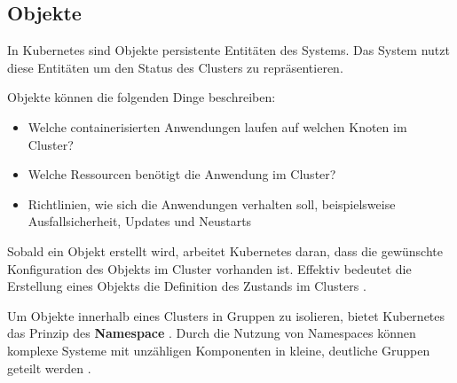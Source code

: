 \subsection{Objekte}
\label{sec:kubernetes:objekte}
In Kubernetes sind Objekte persistente Entitäten des Systems. 
Das System nutzt diese Entitäten um den Status des Clusters zu repräsentieren.

Objekte können die folgenden Dinge beschreiben:
\begin{itemize}
  \item Welche containerisierten Anwendungen laufen auf welchen Knoten im Cluster?
  \item Welche Ressourcen benötigt die Anwendung im Cluster?
  \item Richtlinien, wie sich die Anwendungen verhalten soll, beispielsweise Ausfallsicherheit, Updates und Neustarts
\end{itemize}

Sobald ein Objekt erstellt wird, arbeitet Kubernetes daran, dass die gewünschte Konfiguration des Objekts
im Cluster vorhanden ist. 
Effektiv bedeutet die Erstellung eines Objekts die Definition des Zustands im Clusters \cite{KuberneteObjects_2021}.

Um Objekte innerhalb eines Clusters in Gruppen zu isolieren, bietet Kubernetes das Prinzip des \textbf{Namespace} \cite{kubernetesNamespaces}.
Durch die Nutzung von Namespaces können komplexe Systeme mit unzähligen Komponenten
in kleine, deutliche Gruppen geteilt werden \cite{Marko2018}.